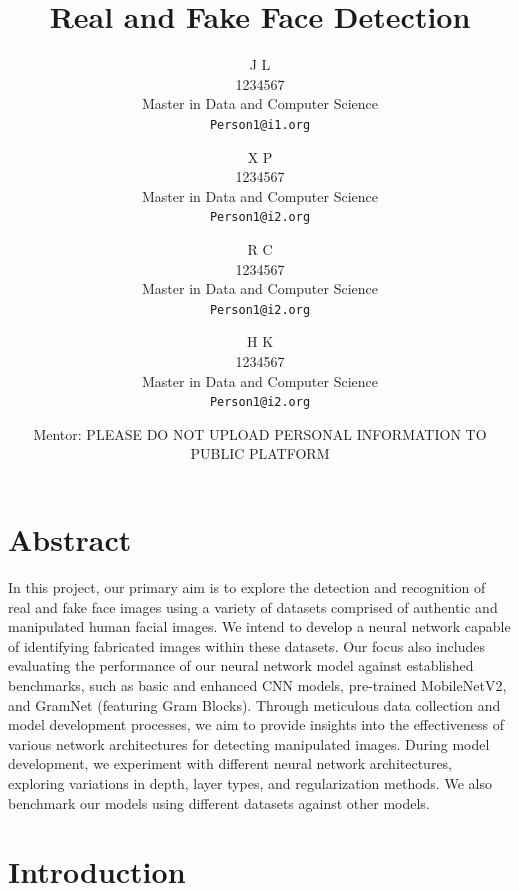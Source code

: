 \documentclass[final]{cvpr}
\begin{document}
\title{Real and Fake Face Detection}  %


\author{J L\\
1234567\\
Master in Data and Computer Science\\
{\tt\small Person1@i1.org}
\and
X P\\
1234567\\
Master in Data and Computer Science\\
{\tt\small Person1@i2.org}
\and
R C\\
1234567\\
Master in Data and Computer Science\\
{\tt\small Person1@i2.org}
\and
H K \\
1234567\\
Master in Data and Computer Science\\
{\tt\small Person1@i2.org}
\and
Mentor: PLEASE DO NOT UPLOAD PERSONAL INFORMATION TO PUBLIC PLATFORM
}

\maketitle
\thispagestyle{empty}


\section{Abstract}
In this project, our primary aim is to explore the detection and recognition of real and fake face images using a variety of datasets comprised of authentic and manipulated human facial images. We intend to develop a neural network capable of identifying fabricated images within these datasets. Our focus also includes evaluating the performance of our neural network model against established benchmarks, such as basic and enhanced CNN models, pre-trained MobileNetV2, and GramNet (featuring Gram Blocks). Through meticulous data collection and model development processes, we aim to provide insights into the effectiveness of various network architectures for detecting manipulated images. During model development, we experiment with different neural network architectures, exploring variations in depth, layer types, and regularization methods. We also benchmark our models using different datasets against other models.
 

\section{Introduction}
\end{document}
